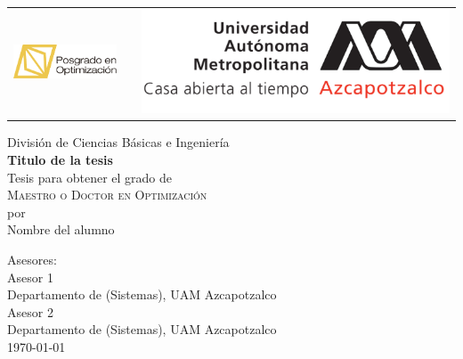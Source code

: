 \begin{titlepage}
      \thispagestyle{empty}
      
      \begin{tabular}{ccc}
               \includegraphics[scale=0.50]{logo-optimista.png}
         &\hspace{0.5cm} &
               \includegraphics[scale=0.4]{uamazc.pdf}
      \end{tabular}

        
     \vspace{1.5cm}

   \begin{center}
   \LARGE División de Ciencias Básicas e Ingeniería\\ 
    \vspace{1.0cm}
   \textbf{Titulo de la tesis}\\
   \vspace{1cm}
   \Large
   Tesis para obtener el grado de\\
   \vspace{0.7cm}
   \textsc{Maestro o Doctor en Optimización}\\
      por\\
      Nombre del alumno
    \vspace{2cm}

      Asesores:\\
         Asesor 1\\ Departamento de (Sistemas), UAM Azcapotzalco\\ \vspace{0.5cm}
         Asesor 2\\ Departamento de (Sistemas), UAM Azcapotzalco\\
     \vspace{3cm}
      \today
      \end{center}
      \vfill
      \end{titlepage}
      \setcounter{page}{2}
      \begin{center}
   \end{center}
